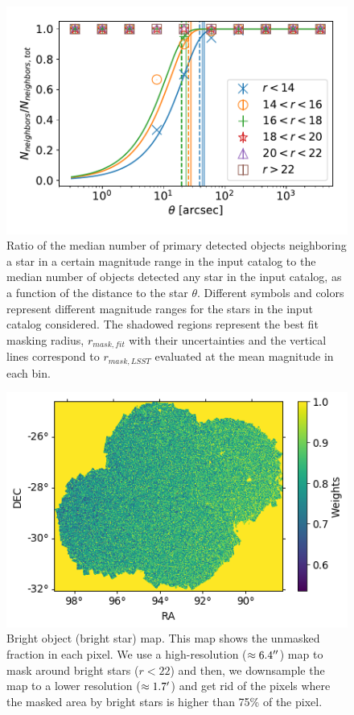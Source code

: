 \documentclass[twocolumn]{aastex62}
\begin{document}
\begin{figure}
\centering
\includegraphics[width=0.9\columnwidth]{bright_object_masking}
\caption{Ratio of the median number of primary detected objects neighboring a star in a certain magnitude range in the input catalog to the median number of objects detected any star in the input catalog, as a function of the distance to the star $\theta$. Different symbols and colors represent different magnitude ranges for the stars in the input catalog considered. The shadowed regions represent the best fit masking radius, $r_{mask,fit}$ with their uncertainties and the vertical lines correspond to $r_{mask,LSST}$ evaluated at the mean magnitude in each bin.}
\label{fig:bright_object_masking}
\end{figure}
\begin{figure}
\centering
\includegraphics[width=0.9\columnwidth]{bo_mask}
\caption{Bright object (bright star) map. This map shows the unmasked fraction in each pixel. We use a high-resolution ($\approx 6.4 \mbox{$^{\prime\prime}$}$) map to mask around bright stars ($r < 22$) and then, we downsample the map to a lower resolution ($\approx 1.7 \mbox{$^\prime$}$) and get rid of the pixels where the masked area by bright stars is higher than 75\% of the pixel.}
\label{fig:bo_mask}
\end{figure} 
\end{document}
